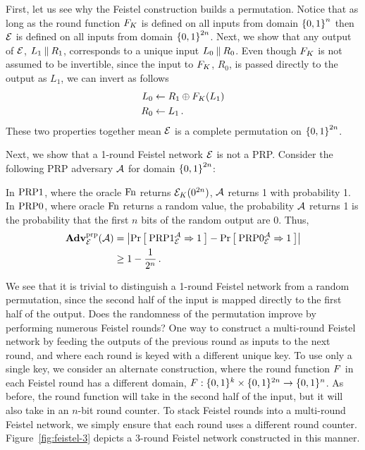 \begin{example}
  First, let us see why the Feistel construction builds a permutation.
  Notice that as long as the round function $\prf_{\prfkey}$ is defined on all inputs from domain $\braces*{0,1}^n$ then $\cipher$ is defined on all inputs from domain $\braces*{0,1}^{2n}$.
  Next, we show that any output of $\cipher$, $L_1\concat R_1$, corresponds to a unique input $L_0\concat R_0$.
  Even though $\prf_{\prfkey}$ is not assumed to be invertible, since the input to $\prf_{\prfkey}$, $R_0$, is passed directly to the output as $L_1$, we can invert as follows
  \begin{align*}
    L_0 &\gets R_1\oplus \prf_{\prfkey}(L_1)\\
    R_0 &\gets L_1\,.
  \end{align*}
  These two properties together mean $\cipher$ is a complete permutation on $\braces*{0,1}^{2n}$.
\end{example}

\begin{example}
  Next, we show that a 1-round Feistel network $\cipher$ is not a PRP.
  Consider the following PRP adversary $\advA$ for domain $\braces*{0,1}^{2n}$:
  \begin{center}
  \end{center}

  In $\PRP1$, where the oracle $\Fn$ returns $\cipher_{\prfkey}(0^{2n})$, $\advA$ returns 1 with probability 1.
  In $\PRP0$, where oracle $\Fn$ returns a random value, the probability $\advA$ returns 1 is the probability that the first $n$ bits of the random output are 0.
  Thus,
\begin{align*}
\AdvPRP{\cipher}{\advA} &= \absv*{\Prob{\PRP1_\cipher^\advA\Rightarrow 1} - \Prob{\PRP0_\cipher^\advA\Rightarrow1} }\\
&\geq 1 - \frac{1}{2^n}\,.
\end{align*}
\end{example}

We see that it is trivial to distinguish a 1-round Feistel network from a random permutation, since the second half of the input is mapped directly to the first half of the output.
Does the randomness of the permutation improve by performing numerous Feistel rounds?
One way to construct a multi-round Feistel network by feeding the outputs of the previous round as inputs to the next round, and where each round is keyed with a different unique key.
To use only a single key, we consider an alternate construction, where the round function $\prf$ in each Feistel round has a different domain, $\prf:\braces{0,1}^{k}\times\braces{0,1}^{2n}\rightarrow\braces{0,1}^n$.
As before, the round function will take in the second half of the input, but it will also take in an $n$-bit round counter.
To stack Feistel rounds into a multi-round Feistel network, we simply ensure that each round uses a different round counter.
Figure~\ref{fig:feistel-3} depicts a 3-round Feistel network constructed in this manner.

